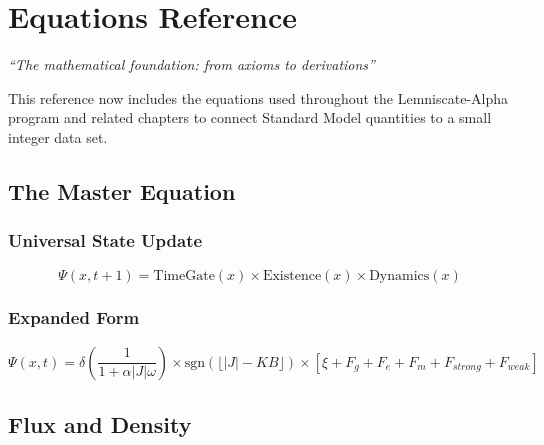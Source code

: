 \documentclass[
  11pt,
  letterpaper,
  twoside,
  openany]{book}
\makeatletter
\let\orig@section\section
\renewcommand{\section}{\needspace{8\baselineskip}\orig@section}
\let\orig@subsection\subsection
\renewcommand{\subsection}{\needspace{6\baselineskip}\orig@subsection}
\makeatother
\begin{document}
\chapter{Equations Reference}\label{sec-equations-reference}

\emph{``The mathematical foundation: from axioms to derivations''}

\begin{tcolorbox}[enhanced jigsaw, colbacktitle=quarto-callout-important-color!10!white, titlerule=0mm, bottomtitle=1mm, bottomrule=.15mm, colback=white, arc=.35mm, breakable, toprule=.15mm, title=\textcolor{quarto-callout-important-color}{\faExclamation}\hspace{0.5em}{Major Update: Derivation Equations Added}, rightrule=.15mm, coltitle=black, leftrule=.75mm, colframe=quarto-callout-important-color-frame, toptitle=1mm, opacityback=0, opacitybacktitle=0.6, left=2mm]

This reference now includes the equations used throughout the
Lemniscate-Alpha program and related chapters to connect Standard Model
quantities to a small integer data set.

\end{tcolorbox}

\section{The Master Equation}\label{the-master-equation}

\subsection{Universal State Update}\label{universal-state-update}

\[
\Psi(x, t+1) = \text{TimeGate}(x) \times \text{Existence}(x) \times \text{Dynamics}(x)
\]

\subsection{Expanded Form}\label{expanded-form}

\[
\Psi(x,t) = \delta\left(\frac{1}{1 + \alpha|J|\omega}\right) \times \text{sgn}\left(\lfloor|J| - KB\rfloor\right) \times \left[\xi + F_g + F_e + F_m + F_{strong} + F_{weak}\right]
\]

\section{Flux and Density}\label{flux-and-density}
\end{document}
